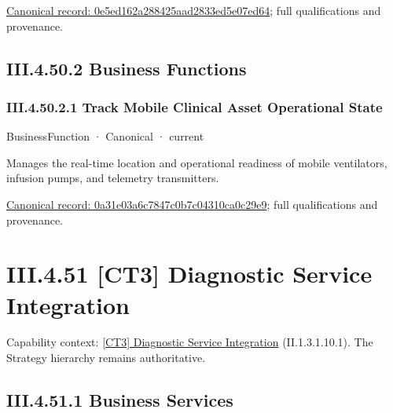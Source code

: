 {\footnotesize \href{../../../../continuum/business/business-service/0e5ed162a288425aad2833ed5e07ed64.md}{Canonical record: 0e5ed162a288425aad2833ed5e07ed64}; full qualifications and provenance.}\par
\subsection*{III.4.50.2 Business Functions}
\label{navigation:III.4.50.2}

\subsubsection*{III.4.50.2.1 Track Mobile Clinical Asset Operational State}
\label{navigation:III.4.50.2.1}

\label{element:0a31e03a6c7847c0b7c04310ca0c29e9}
{\small BusinessFunction · Canonical · current}\par

Manages the real-time location and operational readiness of mobile ventilators, infusion pumps, and telemetry transmitters.


{\footnotesize \href{../../../../continuum/business/business-function/0a31e03a6c7847c0b7c04310ca0c29e9.md}{Canonical record: 0a31e03a6c7847c0b7c04310ca0c29e9}; full qualifications and provenance.}\par
\section*{III.4.51 [CT3] Diagnostic Service Integration}
\label{navigation:III.4.51}

{\small Capability context: \hyperref[element:9ded2f3a28d24017bb921a0cdcf65a2b]{[CT3] Diagnostic Service Integration} (II.1.3.1.10.1). The Strategy hierarchy remains authoritative.}\par
\subsection*{III.4.51.1 Business Services}
\label{navigation:III.4.51.1}


